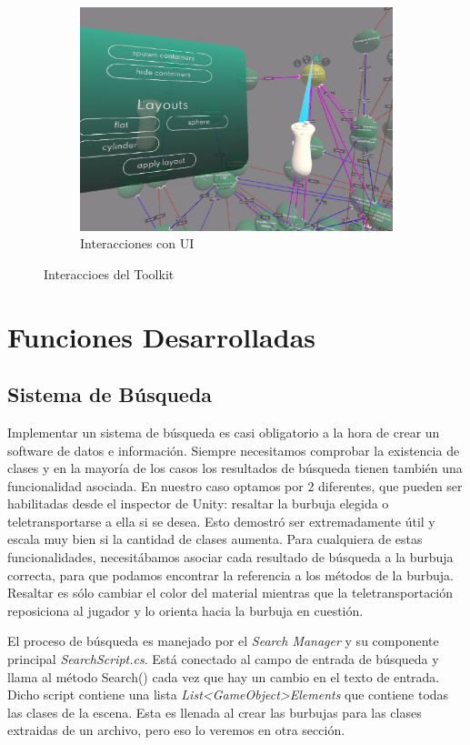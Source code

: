 \begin{figure}[ht]
\begin{subfigure}{0.45\textwidth}
       \includegraphics[width=\textwidth]{chapter2/figures/highlight.png}
       \caption{Interacciones con UI}
   \end{subfigure}
   \caption{Interaccioes del Toolkit}
   \label{fig:subfigures}
\end{figure}

\section{Funciones Desarrolladas}

\subsection{Sistema de Búsqueda}

Implementar un sistema de búsqueda es casi obligatorio a la hora de crear un software de datos e información. Siempre necesitamos comprobar la existencia de clases y en la mayoría de los casos los resultados de búsqueda tienen también una funcionalidad asociada. En nuestro caso optamos por 2 diferentes, que pueden ser habilitadas desde el inspector de Unity: resaltar la burbuja elegida o teletransportarse a ella si se desea. Esto demostró ser extremadamente útil y escala muy bien si la cantidad de clases aumenta.
Para cualquiera de estas funcionalidades, necesitábamos asociar cada resultado de búsqueda a la burbuja correcta, para que podamos encontrar la referencia a los métodos de la burbuja. Resaltar es sólo cambiar el color del material mientras que la teletransportación reposiciona al jugador y lo orienta hacia la burbuja en cuestión.

El proceso de búsqueda es manejado por el \textit{Search Manager} y su componente principal \textit{SearchScript.cs}. Está conectado al campo de entrada de búsqueda y llama al método Search() cada vez que hay un cambio en el texto de entrada. Dicho script contiene una lista \textit{List<GameObject>Elements} que contiene todas las clases de la escena. Esta es llenada al crear las burbujas para las clases extraidas de un archivo, pero eso lo veremos en otra sección.

